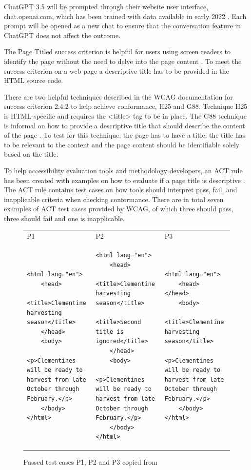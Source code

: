 ChatGPT 3.5 will be prompted through their website user interface, chat.openai.com, which has been trained with data available in early 2022 \citep{openai_35}. Each prompt will be opened as a new chat to ensure that the conversation feature in ChatGPT does not affect the outcome.

The Page Titled success criterion is helpful for users using screen readers to identify the page without the need to delve into the page content \citep{wcag_page_titled}. To meet the success criterion on a web page a descriptive title has to be provided in the HTML source code. 

There are two helpful techniques described in the WCAG documentation for success criterion 2.4.2 to help achieve conformance, H25 and G88. Technique H25 is HTML-specific and requires the <title> tag to be in place. The G88 technique is informal on how to provide a descriptive title that should describe the content of the page \citep{g88}. To test for this technique, the page has to have a title, the title has to be relevant to the content and the page content should be identifiable solely based on the title.

To help accessibility evaluation tools and methodology developers, an ACT rule has been created with examples on how to evaluate if a page title is descriptive \citep{act_rule_g88}. The ACT rule contains test cases on how tools should interpret pass, fail, and inapplicable criteria when checking conformance. There are in total seven examples of ACT test cases provided by WCAG, of which three should pass, three should fail and one is inapplicable.

\begin{figure}[htbp]
\caption{Passed test cases P1, P2 and P3 copied from \textcite{act_rule_g88}}
\label{passed_cases}
\begin{tabular}{|p{4.9cm}|p{4.9cm}|p{4.9cm}|}
P1 & P2 & P3 \\
\begin{lstlisting}
<html lang="en">
	<head>
		<title>Clementine harvesting season</title>
	</head>
	<body>
		<p>Clementines will be ready to harvest from late October through February.</p>
	</body>
</html>
\end{lstlisting}&
\begin{lstlisting}
<html lang="en">
	<head>
		<title>Clementine harvesting season</title>
		<title>Second title is ignored</title>
	</head>
	<body>
		<p>Clementines will be ready to harvest from late October through February.</p>
	</body>
</html>
\end{lstlisting}&
\begin{lstlisting}
<html lang="en">
	<head> </head>
	<body>
		<title>Clementine harvesting season</title>
		<p>Clementines will be ready to harvest from late October through February.</p>
	</body>
</html>
\end{lstlisting}
\end{tabular}
\end{figure}

